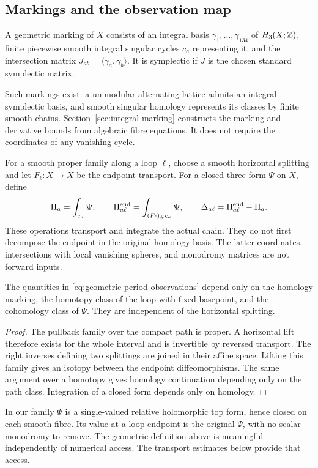 \subsection{Markings and the observation map}

\begin{definition}\label{def:geometric-marking}
A geometric marking of $X$ consists of an integral basis
$\gamma_1,\ldots,\gamma_{134}$ of $H_3(X;\mathbb Z)$, finite
piecewise smooth integral singular cycles $c_a$ representing it,
and the intersection matrix $J_{ab}=\langle\gamma_a,\gamma_b\rangle$.
It is symplectic if $J$ is the chosen standard symplectic matrix.
\end{definition}

Such markings exist: a unimodular alternating lattice admits an
integral symplectic basis, and smooth singular homology represents
its classes by finite smooth chains. Section~\ref{sec:integral-marking}
constructs the marking and derivative bounds from algebraic fibre
equations. It does not require the coordinates of any vanishing cycle.

For a smooth proper family along a loop $\ell$, choose a smooth
horizontal splitting and let $F_\ell:X\longrightarrow X$ be the
endpoint transport. For a closed three-form $\Psi$ on $X$, define
\begin{equation}\label{eq:geometric-period-observations}
 \Pi_a=\int_{c_a}\Psi,\qquad
 \Pi_{a\ell}^{\rm end}=\int_{(F_\ell)_\#c_a}\Psi,\qquad
 \Delta_{a\ell}=\Pi_{a\ell}^{\rm end}-\Pi_a.
\end{equation}
These operations transport and integrate the actual chain. They
do not first decompose the endpoint in the original homology basis.
The latter coordinates, intersections with local vanishing spheres,
and monodromy matrices are not forward inputs.

\begin{lemma}\label{lem:transport-independence}
The quantities in \eqref{eq:geometric-period-observations} depend
only on the homology marking, the homotopy class of the loop with
fixed basepoint, and the cohomology class of $\Psi$. They are
independent of the horizontal splitting.
\end{lemma}

\begin{proof}
The pullback family over the compact path is proper. A horizontal
lift therefore exists for the whole interval and is invertible by
reversed transport. The right inverses defining two splittings are
joined in their affine space. Lifting this family gives an isotopy
between the endpoint diffeomorphisms. The same argument over a
homotopy gives homology continuation depending only on the path
class. Integration of a closed form depends only on homology.
\end{proof}

In our family $\Psi$ is a single-valued relative holomorphic top
form, hence closed on each smooth fibre. Its value at a loop endpoint
is the original $\Psi$, with no scalar monodromy to remove.
The geometric definition above is meaningful independently of
numerical access. The transport estimates below provide that access.
